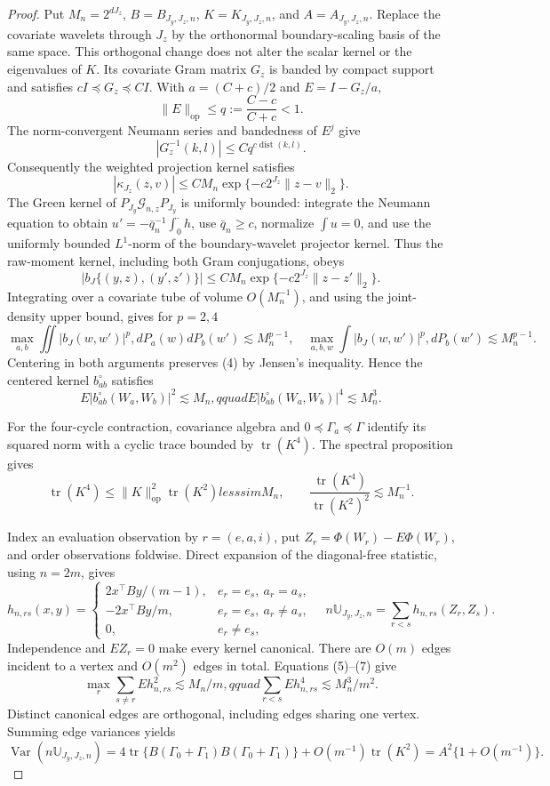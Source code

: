 \documentclass{article}
\begin{document}
\begin{proof}
Put \(M_n=2^{dJ_z}\), \(B=B_{J_y,J_z,n}\), \(K=K_{J_y,J_z,n}\), and \(A=A_{J_y,J_z,n}\).  Replace the covariate wavelets through \(J_z\) by the orthonormal boundary-scaling basis of the same space.  This orthogonal change does not alter the scalar kernel or the eigenvalues of \(K\).  Its covariate Gram matrix \(G_z\) is banded by compact support and satisfies \(cI\preceq G_z\preceq CI\).  With \(a=(C+c)/2\) and \(E=I-G_z/a\),
\[
\|E\|_{\mathrm{op}}\le q:=\frac{C-c}{C+c}<1.
\]
The norm-convergent Neumann series and bandedness of \(E^j\) give
\[
|G_z^{-1}(k,l)|\le Cq^{c\operatorname{dist}(k,l)}. \tag{1}
\]
Consequently the weighted projection kernel satisfies
\[
|\kappa_{J_z}(z,v)|\le CM_n\exp\{-c2^{J_z}\|z-v\|_2\}. \tag{2}
\]
The Green kernel of \(P_{J_y}\mathcal G_{n,z}P_{J_y}\) is uniformly bounded: integrate the Neumann equation to obtain \(u'=-\bar q_n^{-1}\int_0^\cdot h\), use \(\bar q_n\ge c\), normalize \(\int u=0\), and use the uniformly bounded \(L^1\)-norm of the boundary-wavelet projector kernel.  Thus the raw-moment kernel, including both Gram conjugations, obeys
\[
|b_J\{(y,z),(y',z')\}|
\le CM_n\exp\{-c2^{J_z}\|z-z'\|_2\}. \tag{3}
\]
Integrating over a covariate tube of volume \(O(M_n^{-1})\), and using the joint-density upper bound, gives for \(p=2,4\)
\[
\max_{a,b}\iint|b_J(w,w')|^p,dP_a(w)dP_b(w')\lesssim M_n^{p-1},
\quad
\max_{a,b,w}\int|b_J(w,w')|^p,dP_b(w')\lesssim M_n^{p-1}. \tag{4}
\]
Centering in both arguments preserves (4) by Jensen's inequality.  Hence the centered kernel \(b_{ab}^{\circ}\) satisfies
\[
E|b_{ab}^{\circ}(W_a,W_b)|^2\lesssim M_n,qquad
E|b_{ab}^{\circ}(W_a,W_b)|^4\lesssim M_n^3. \tag{5}
\]

For the four-cycle contraction, covariance algebra and \(0\preceq\Gamma_a\preceq\Gamma\) identify its squared norm with a cyclic trace bounded by \(\operatorname{tr}(K^4)\).  The spectral proposition gives
\[
\operatorname{tr}(K^4)\le\|K\|_{\mathrm{op}}^2\operatorname{tr}(K^2)lesssim M_n,
\qquad
\frac{\operatorname{tr}(K^4)}{\operatorname{tr}(K^2)^2}\lesssim M_n^{-1}. \tag{6}
\]

Index an evaluation observation by \(r=(e,a,i)\), put \(Z_r=\Phi(W_r)-E\Phi(W_r)\), and order observations foldwise.  Direct expansion of the diagonal-free statistic, using \(n=2m\), gives
\[
h_{n,rs}(x,y)=
\begin{cases}
2x^\top By/(m-1),&e_r=e_s,\ a_r=a_s,\\
-2x^\top By/m,&e_r=e_s,\ a_r\ne a_s,\\
0,&e_r\ne e_s,
\end{cases}
\quad
n\mathbb U_{J_y,J_z,n}=\sum_{r<s}h_{n,rs}(Z_r,Z_s). \tag{7}
\]
Independence and \(EZ_r=0\) make every kernel canonical.  There are \(O(m)\) edges incident to a vertex and \(O(m^2)\) edges in total.  Equations (5)--(7) give
\[
\max_r\sum_{s\ne r}Eh_{n,rs}^2\lesssim M_n/m,qquad
\sum_{r<s}Eh_{n,rs}^4\lesssim M_n^3/m^2. \tag{8}
\]
Distinct canonical edges are orthogonal, including edges sharing one vertex.  Summing edge variances yields
\[
\operatorname{Var}(n\mathbb U_{J_y,J_z,n})
=4\operatorname{tr}\{B(\Gamma_0+\Gamma_1)B(\Gamma_0+\Gamma_1)\}
+O(m^{-1})\operatorname{tr}(K^2)
=A^2\{1+O(m^{-1})\}. \tag{9}
\]


\end{proof}
\end{document}

